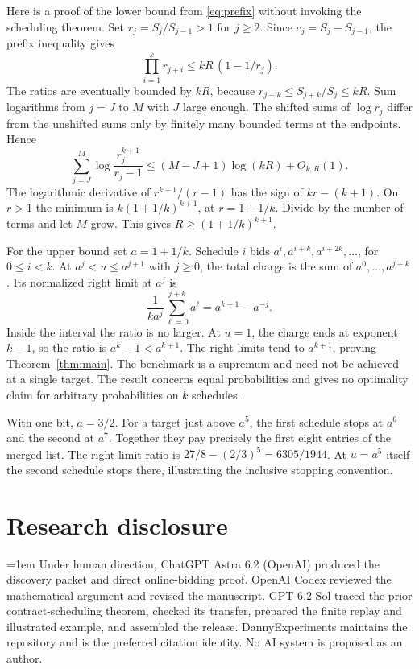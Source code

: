 \documentclass[11pt,a4paper]{amsart}
\begin{document}
Here is a proof of the lower bound from \eqref{eq:prefix} without invoking the scheduling theorem. Set \(r_j=S_j/S_{j-1}>1\) for \(j\ge2\). Since \(c_j=S_j-S_{j-1}\), the prefix inequality gives
\[
 \prod_{i=1}^k r_{j+i}\le kR\,(1-1/r_j).
\]
The ratios are eventually bounded by \(kR\), because \(r_{j+k}\le S_{j+k}/S_j\le kR\). Sum logarithms from \(j=J\) to \(M\) with \(J\) large enough. The shifted sums of \(\log r_j\) differ from the unshifted sums only by finitely many bounded terms at the endpoints. Hence
\[
 \sum_{j=J}^M \log\frac{r_j^{k+1}}{r_j-1}
   \le (M-J+1)\log(kR)+O_{k,R}(1).
\]
The logarithmic derivative of \(r^{k+1}/(r-1)\) has the sign of \(kr-(k+1)\). On \(r>1\) the minimum is \(k(1+1/k)^{k+1}\), at \(r=1+1/k\). Divide by the number of terms and let \(M\) grow. This gives \(R\ge(1+1/k)^{k+1}\).

For the upper bound set \(a=1+1/k\). Schedule \(i\) bids \(a^i,a^{i+k},a^{i+2k},\ldots\), for \(0\le i<k\). At \(a^j<u\le a^{j+1}\) with \(j\ge0\), the total charge is the sum of \(a^0,\ldots,a^{j+k}\). Its normalized right limit at \(a^j\) is
\[
 \frac{1}{ka^j}\sum_{\ell=0}^{j+k} a^\ell
   =a^{k+1}-a^{-j}.
\]
Inside the interval the ratio is no larger. At \(u=1\), the charge ends at exponent \(k-1\), so the ratio is \(a^k-1<a^{k+1}\). The right limits tend to \(a^{k+1}\), proving Theorem~\ref{thm:main}. The benchmark is a supremum and need not be achieved at a single target. The result concerns equal probabilities and gives no optimality claim for arbitrary probabilities on \(k\) schedules.

With one bit, \(a=3/2\). For a target just above \(a^5\), the first schedule stops at \(a^6\) and the second at \(a^7\). Together they pay precisely the first eight entries of the merged list. The right-limit ratio is \(27/8-(2/3)^5=6305/1944\). At \(u=a^5\) itself the second schedule stops there, illustrating the inclusive stopping convention.

\section*{Research disclosure}

\begingroup{}\emergencystretch=1em\relax
Under human direction, ChatGPT Astra 6.2 (OpenAI) produced the discovery packet and direct online-bidding proof. OpenAI Codex reviewed the mathematical argument and revised the manuscript. GPT-6.2 Sol traced the prior contract-scheduling theorem, checked its transfer, prepared the finite replay and illustrated example, and assembled the release. DannyExperiments maintains the repository and is the preferred citation identity. No AI system is proposed as an author.
\par\endgroup
\end{document}
